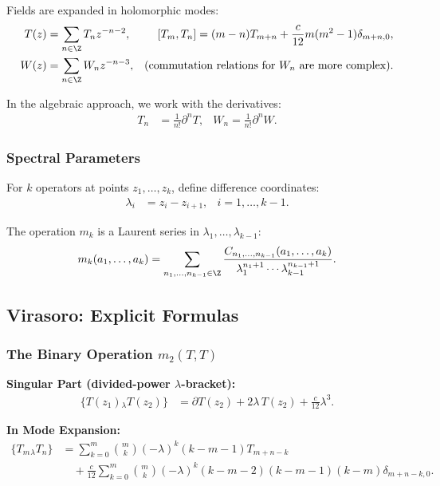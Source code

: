 Fields are expanded in holomorphic modes:
\begin{align}
T(z) &= \sum_{n \in \Z} T_n z^{-n-2}, & [T_m, T_n] = (m-n)T_{m+n} + \frac{c}{12}m(m^2-1)\delta_{m+n,0},\\
W(z) &= \sum_{n \in \Z} W_n z^{-n-3}, & (\text{commutation relations for } W_n \text{ are more complex}).
\end{align}

In the algebraic approach, we work with the derivatives:
\begin{align}
T_n &= \frac{1}{n!} \partial^n T, & W_n = \frac{1}{n!} \partial^n W.
\end{align}

\subsubsection{Spectral Parameters}

For $k$ operators at points $z_1, \ldots, z_k$, define difference coordinates:
\begin{align}
\lambda_i &= z_i - z_{i+1}, & i = 1, \ldots, k-1.
\end{align}

The operation $m_k$ is a Laurent series in $\lambda_1, \ldots, \lambda_{k-1}$:
\begin{equation}
m_k(a_1, \ldots, a_k) = \sum_{n_1, \ldots, n_{k-1} \in \Z} \frac{C_{n_1, \ldots, n_{k-1}}(a_1, \ldots, a_k)}{\lambda_1^{n_1+1} \cdots \lambda_{k-1}^{n_{k-1}+1}}.
\end{equation}

\subsection{Virasoro: Explicit Formulas}

\subsubsection{The Binary Operation $m_2(T,T)$}

\textbf{Singular Part (divided-power $\lambda$-bracket):}
\begin{align}
\{T(z_1) {}_\lambda T(z_2)\} &= \partial T(z_2) + 2\lambda\,T(z_2) + \frac{c}{12}\lambda^3.
\end{align}

\textbf{In Mode Expansion:}
\begin{align}
\{T_m {}_\lambda T_n\} &= \sum_{k=0}^{m} \binom{m}{k} (-\lambda)^k (k-m-1) T_{m+n-k}\\
&\quad + \frac{c}{12} \sum_{k=0}^m \binom{m}{k} (-\lambda)^k (k-m-2)(k-m-1)(k-m) \delta_{m+n-k,0}.
\end{align}


